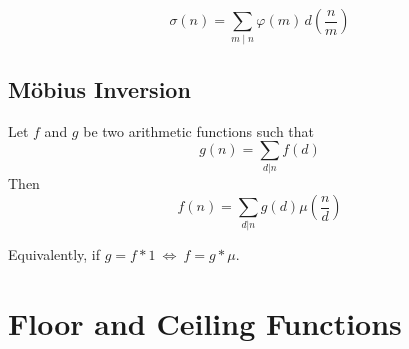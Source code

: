         \begin{lemma}
            \[\sigma(n)=\sum_{m\mid n}\varphi(m)\,d\left(\frac{n}{m}\right)\]
        \end{lemma}

    \subsection{Möbius Inversion}
        \begin{theorem}
            Let $f$ and $g$ be two arithmetic functions such that
            \[g(n) = \sum_{d|n} f(d)\]
            Then
            \[f(n) = \sum_{d|n} g(d)\mu\left(\frac{n}{d}\right)\]

            Equivalently, if $g = f * 1 \ \iff \ f = g * \mu$.
        \end{theorem}
    
\section{Floor and Ceiling Functions}
